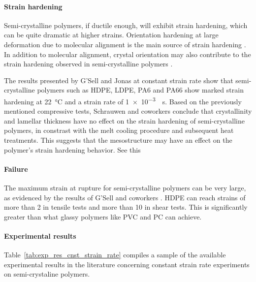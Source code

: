 \paragraph{Strain hardening}
Semi-crystalline polymers, if ductile enough, will exhibit strain hardening, which can be quite dramatic at higher strains.
Orientation hardening at large deformation due to molecular alignment is the main source of strain hardening \citep{ahziModelingDeformationBehavior2003}.
In addition to molecular alignment, crystal orientation may also contribute to the strain hardening observed in semi-crystalline polymers \citep{abdul-hameedTwophaseHyperelasticviscoplasticConstitutive2014}.

The results presented by G'Sell and Jonas \citep{gsellYieldTransientEffects1981} at constant strain rate show that semi-crystalline polymers such as HDPE, LDPE, PA6 and PA66 show marked strain hardening at \SI{22}{\celsius} and a strain rate of \SI{1e-3}{\per\second}.
Based on the previously mentioned compressive tests, Schrauwen and coworkers \citep{schrauwenIntrinsicDeformationBehavior2004} conclude that crystallinity and lamellar thickness have no effect on the strain hardening of semi-crystalline polymers, in constrast with the melt cooling procedure and subsequent heat treatments.
This suggests that the mesostructure may have an effect on the polymer's strain hardening behavior. \colorbox{BrickRed}{See this}

\paragraph{Failure}
The maximum strain at rupture for semi-crystalline polymers can be very large, as evidenced by the results of G'Sell and coworkers \citep{gsellYieldTransientEffects1981, gsellApplicationPlaneSimple1983}.
HDPE can reach strains of more than 2 in tensile tests and more than 10 in shear tests.
This is significantly greater than what glassy polymers like PVC and PC can achieve.

\paragraph{Experimental results}

Table~\ref{tab:exp_res_cnst_strain_rate} compiles a sample of the available experimental results in the literature concerning constant strain rate experiments on semi-crystaline polymers.

